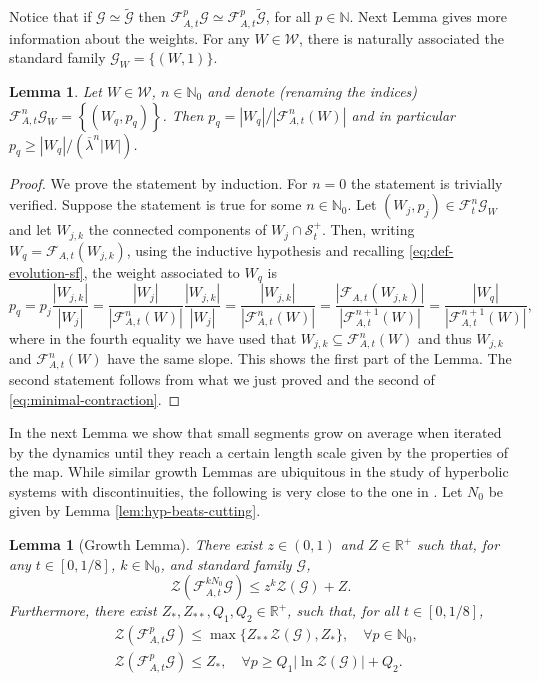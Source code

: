 \documentclass{amsart}
\numberwithin{equation}{section}
\newtheorem{lemma}[theorem]{Lemma}
\renewcommand{\ge}{\geqslant}
\renewcommand{\le}{\leqslant}
\newcommand\cF{{\mathcal F}}
\newcommand\cG{{\mathcal G}}
\newcommand\cS{{\mathcal S}}
\newcommand\cW{{\mathcal W}}
\newcommand\cZ{{\mathcal Z}}
\newcommand\bN{{\mathbb N}}
\newcommand\bR{{\mathbb R}}
\newcommand{\catt}{\cF_{A,t}}
\begin{document}
Notice that if \(\cG \simeq \widetilde \cG\) then \(\catt^p \cG \simeq \catt^p \widetilde \cG \), for all \(p \in \bN\). Next Lemma gives more information about the weights. For any \(W \in \cW\), there is naturally associated the standard family \(\cG_{W} = \{(W,1)\}\).
\begin{lemma}\label{lem:weigths-single-curve}
 Let \(W \in \cW\), \(n \in \bN_0\) and denote (renaming the indices) \(\catt^n \cG_{W} = \left\{(W_q, p_q)\right\}\). Then \(p_q = |W_q|/|\catt^n (W)|\) and in particular \(p_q \ge  |W_q|/(\overline \lambda^n |W|)\).
\end{lemma} 
\begin{proof}
We prove the statement by induction. For \(n = 0\) the statement is trivially verified. Suppose the statement is true for some \(n \in \bN_0\). Let \((W_j, p_j) \in \cF_t^n \cG_W\) and let \(W_{j,k}\) the connected components of \(W_j \cap \cS_t^{+}\). 
Then, writing \(W_q = \catt (W_{j,k})\), using the inductive hypothesis and recalling \eqref{eq:def-evolution-sf}, the weight associated to \(W_q\) is
\[
p_{q} = p_j \frac{| W_{j,k}|}{|W_j|} =  \frac{|W_j|}{|\catt^n (W) |}  \frac{|W_{j,k}|}{|W_j|}  = \frac{| W_{j,k}|}{|\catt^n (W) |} = \frac{|\catt (W_{j,k})|}{|\catt^{n+1}(W)|} = \frac{|W_q|}{|\catt^{n+1}(W)|},
\] 
where in the fourth equality we have used that \(W_{j,k} \subseteq \catt^n (W)\) and thus \(W_{j,k}\) and \(\catt^n (W)\) have the same slope. This shows the first part of the Lemma. The second statement follows from what we just proved and the second of \eqref{eq:minimal-contraction}.
\end{proof}
In the next Lemma we show that small segments grow on average when iterated by the dynamics until they reach a certain length scale given by the properties of the map. While similar growth Lemmas are ubiquitous in the study of hyperbolic systems with discontinuities, the following is very close to the one in \cite{C99}. Let \(N_0\) be given by Lemma \ref{lem:hyp-beats-cutting}.
\begin{lemma}[Growth Lemma]\label{lem:growth-lemma}
  There exist \(z \in (0,1)\) and \(Z \in \bR^+\) such that, for any \(t \in [0, 1/8]\), \(k \in \bN_0\), and standard family \(\cG\),
  \[
      \cZ(\catt^{k N_0} \cG) \le z^k \cZ (\cG) + Z.
  \]
  Furthermore, there exist \(Z_{*}, Z_{**}, Q_1,Q_2 \in \bR^+\), such that, for all \(t \in [0, 1/8]\),
  \[
  \begin{split}
    &\cZ(\catt^{p}\cG) \le \max\{Z_{**}\cZ(\cG), Z_{*}\}, \quad \forall p \in \bN_0,\\
    &\cZ(\catt^{p}\cG) \le Z_{*}, \quad \forall p \ge Q_1\left|\ln \cZ(\cG)\right| + Q_2.
  \end{split}
  \]
\end{lemma}
\end{document}

